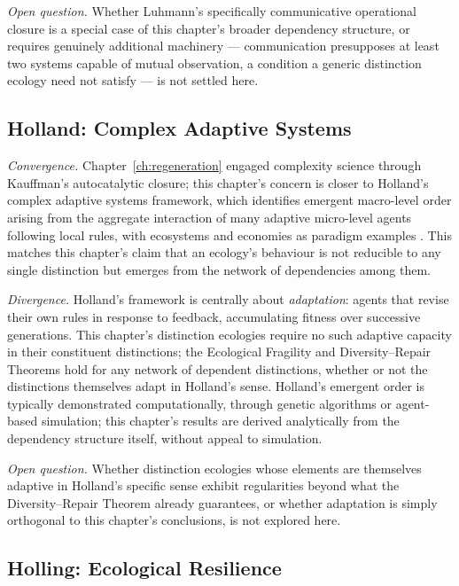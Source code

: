 \documentclass[12pt,twoside,openright]{book}
\begin{document}
\emph{Open question.} Whether Luhmann's specifically
communicative operational closure is a special case of this
chapter's broader dependency structure, or requires genuinely
additional machinery --- communication presupposes at least two
systems capable of mutual observation, a condition a generic
distinction ecology need not satisfy --- is not settled here.

\subsection*{Holland: Complex Adaptive Systems}

\emph{Convergence.} Chapter~\ref{ch:regeneration} engaged
complexity science through Kauffman's autocatalytic closure;
this chapter's concern is closer to Holland's complex adaptive
systems framework, which identifies emergent macro-level order
arising from the aggregate interaction of many adaptive
micro-level agents following local rules, with ecosystems and
economies as paradigm examples \parencite{holland1995}. This
matches this chapter's claim that an ecology's behaviour is not
reducible to any single distinction but emerges from the
network of dependencies among them.

\emph{Divergence.} Holland's framework is centrally about
\emph{adaptation}: agents that revise their own rules in
response to feedback, accumulating fitness over successive
generations. This chapter's distinction ecologies require no
such adaptive capacity in their constituent distinctions; the
Ecological Fragility and Diversity--Repair Theorems hold for any
network of dependent distinctions, whether or not the
distinctions themselves adapt in Holland's sense. Holland's
emergent order is typically demonstrated computationally, through
genetic algorithms or agent-based simulation; this chapter's
results are derived analytically from the dependency structure
itself, without appeal to simulation.

\emph{Open question.} Whether distinction ecologies whose
elements are themselves adaptive in Holland's specific sense
exhibit regularities beyond what the Diversity--Repair Theorem
already guarantees, or whether adaptation is simply orthogonal
to this chapter's conclusions, is not explored here.

\subsection*{Holling: Ecological Resilience}
\end{document}
